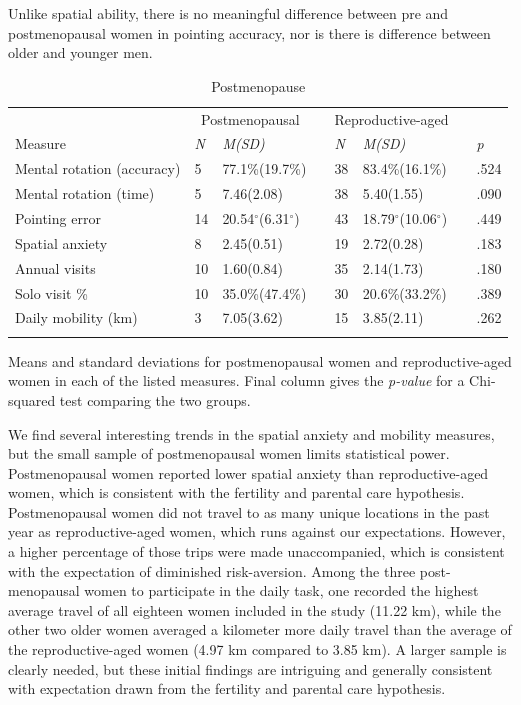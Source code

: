 Unlike spatial ability, there is no meaningful difference between pre and postmenopausal women in pointing accuracy, nor is there is difference between older and younger men.

\begin{table}[h!]
\caption{Postmenopause}
\label{tab:meno}  
\begin{tabular}{llllllll}
\hline\noalign{\smallskip}
& \multicolumn{2}{c}{Postmenopausal} && \multicolumn{2}{c}{Reproductive-aged} && \\
Measure & \emph{N} & \emph{M(SD)} && \emph{N} & \emph{M(SD)} && \emph{p} \\
\noalign{\smallskip}\hline\noalign{\smallskip}
Mental rotation (accuracy) & 5 & 77.1\%(19.7\%) && 38 & 83.4\%(16.1\%) && .524 \\
Mental rotation (time) & 5 & 7.46(2.08) && 38 & 5.40(1.55) && .090 \\
Pointing error & 14 & 20.54$^{\circ}$(6.31$^{\circ}$) && 43 & 18.79$^{\circ}$(10.06$^{\circ}$) && .449 \\
Spatial anxiety & 8 & 2.45(0.51) && 19 & 2.72(0.28) && .183 \\
Annual visits & 10 & 1.60(0.84) && 35 & 2.14(1.73) && .180 \\
Solo visit \% & 10 & 35.0\%(47.4\%) && 30 & 20.6\%(33.2\%) && .389 \\
Daily mobility (km) & 3 & 7.05(3.62) && 15 & 3.85(2.11) && .262 \\
\noalign{\smallskip}\hline
\end{tabular}\par
\bigskip
Means and standard deviations for postmenopausal women and reproductive-aged women in each of the listed measures. Final column gives the \emph{p-value} for a Chi-squared test comparing the two groups. \end{table}	

We find several interesting trends in the spatial anxiety and mobility measures, but the small sample of postmenopausal women limits statistical power.  Postmenopausal women reported lower spatial anxiety than reproductive-aged women, which is consistent with the fertility and parental care hypothesis.  Postmenopausal women did not travel to as many unique locations in the past year as reproductive-aged women, which runs against our expectations.  However, a higher percentage of those trips were made unaccompanied, which is consistent with the expectation of diminished risk-aversion.  Among the three post-menopausal women to participate in the daily task, one recorded the highest average travel of all eighteen women included in the study (11.22 km), while the other two older women averaged a kilometer more daily travel than the average of the reproductive-aged women (4.97 km compared to 3.85 km).  A larger sample is clearly needed, but these initial findings are intriguing and generally consistent with expectation drawn from the fertility and parental care hypothesis.

